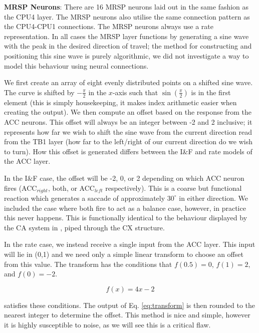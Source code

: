 \documentclass[a4paper,11pt,twoside,openright]{article}
\begin{document}
\textbf{MRSP Neurons}:
There are 16 MRSP neurons laid out in the same fashion as the CPU4 layer. The
MRSP neurons also utilise the same connection pattern as the CPU4-CPU1
connections. The MRSP neurons always use a rate representation. In all
cases the MRSP layer functions by generating a sine wave with the peak in the
desired direction of travel; the method for constructing and positioning this
sine wave is purely algorithmic, we did not investigate a way to model this
behaviour using neural connections.
\newline\par

We first create an array of eight evenly distributed points on a shifted sine wave.
The curve is shifted by $-\frac{\pi}{2}$ in the $x$-axis such that
$\sin(\frac{\pi}{2})$ is in the first element (this is simply housekeeping, it
makes index arithmetic easier when creating the output). We then compute an
offset based on the response from the ACC neurons. This offset will always be
an integer between -2 and 2 inclusive; it represents how far we wish to shift the
sine wave from the current direction read from the TB1 layer (how far to the
left/right of our current direction do we wish to turn). How this offset is
generated differs between the I\&F and rate models of the ACC layer.
\newline\par

In the I\&F case, the offset will be -2, 0, or 2 depending on which
ACC neuron fires (ACC$_{right}$, both, or ACC$_{left}$ respectively). This is a
coarse but functional reaction which generates a saccade of approximately $30^{\circ}$ in
either direction. We included the case where both fire to act as a balance case,
however, in practice this never happens. This is functionally identical to
the behaviour displayed by the CA system in \cite{Mitchell2018}, piped through
the CX structure.
\newline\par

In the rate case, we instead receive a single input from the ACC layer.
This input will lie in (0,1) and we need only a simple linear transform to
choose an offset from this value. The transform has the conditions that
$f(0.5) = 0$, $f(1) = 2$, and $f(0) = -2$.

\begin{equation}
  \label{eq:transform}
 f(x) = 4x - 2
\end{equation}

satisfies these conditions. The output of Eq. \ref{eq:transform} is then rounded
to the nearest integer to determine the offset. This method is nice and simple,
however it is highly susceptible to noise, as we will see this is a critical
flaw.
\end{document}
